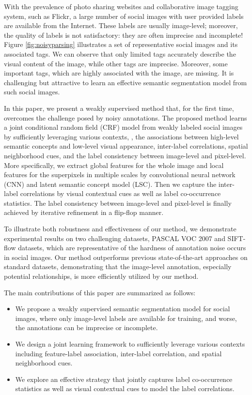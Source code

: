 With the prevalence of photo sharing websites and collaborative image tagging system, such as Flickr, a large number of social images with user provided labels are available from the Internet.
These labels are usually image-level; moreover, the quality of labels is not satisfactory: they are often imprecise and incomplete!
Figure \ref{fig:noisyparsing} illustrates a set of representative social images and its associated tags.
We can observe that only limited tags accurately describe the visual content of the image, while other tags are imprecise.
Moreover, some important tags, which are highly associated with the image, are missing.
It is challenging but attractive to learn an effective semantic segmentation model from such social images.

In this paper, we present a weakly supervised method that, for the first time, overcomes the challenge posed by noisy annotations.
The proposed method learns a joint conditional random field (CRF) model from weakly labeled social images by sufficiently leveraging various contexts, \eg, the associations between high-level semantic concepts and low-level visual appearance, inter-label correlations, spatial neighborhood cues, and the label consistency between image-level and pixel-level.
More specifically, we extract global features for the whole image and local features for the superpixels in multiple scales by convolutional neural network (CNN) and latent semantic concept model (LSC).
Then we capture the inter-label correlations by visual contextual cues as well as label co-occurrence statistics.
The label consistency between image-level and pixel-level is finally achieved by iterative refinement in a flip-flop manner.

To illustrate both robustness and effectiveness of our method, we demonstrate experimental results on two challenging datasets, PASCAL VOC 2007 and SIFT-flow datasets, which are representative of the hardness of annotation noise occurs in social images.
Our method outperforms previous state-of-the-art approaches on standard datasets, demonstrating that the image-level annotation, especially potential relationships, is more efficiently utilized by our method. 

The main contributions of this paper are summarized as follows:
\begin{itemize}
  \item We propose a weakly supervised semantic segmentation model for social images, where only image-level labels are available for training, and worse, the annotations can be imprecise or incomplete. 
  \item We design a joint learning framework to sufficiently leverage various contexts including feature-label association, inter-label correlation, and spatial neighborhood cues.
  \item We explore an effective strategy that jointly captures label co-occurrence statistics as well as visual contextual cues to model the label correlations.
\end{itemize}
